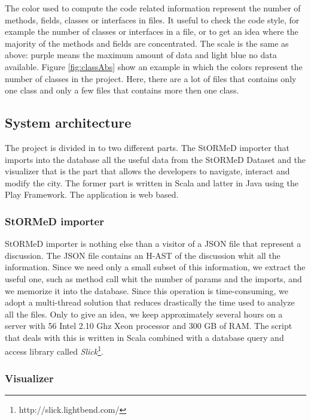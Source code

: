 \documentclass[]{usiinfbachelorproject}
\newcommand {\stormed}[0]{StORMeD\xspace}
\begin{document}
The color used to compute the code related information represent  the number of methods, fields, classes or interfaces in files. It useful to check the code style, for example the number of classes or interfaces in a file, or to get an idea where the majority of the methods and fields are concentrated. The scale is the same as above: purple means the maximum amount of  data and light blue no data available.
Figure \ref{fig:classAbs} show an example in which the colors represent the number of classes in the project. Here, there are a lot of files that contains only one class and only a few files that contains more then one class. 
	




\newpage


\subsection{System architecture }
The project is divided in to two different parts. The \stormed importer that imports into the database all the useful data from the \stormed Dataset and the visualizer that is the part that allows the developers to navigate, interact and modify the city. The former part is written in Scala and latter in Java using the Play Framework. The application is web based. 




\subsubsection{\stormed importer}
\stormed importer is nothing else than a visitor of a JSON file that represent a discussion. The JSON file contains an H-AST of the discussion whit all the information. Since we need only a small subset of this information, we extract the useful one, such as method call whit the number of params and the imports, and we memorize it into the database. Since this operation is time-consuming, we adopt a multi-thread solution that reduces drastically the time used to analyze all the files. Only to give an idea, we keep approximately several hours on a server with 56 Intel 2.10 Ghz Xeon processor and 300 GB of RAM.
The script that deals with this is written in Scala combined with a database query and access library called \textit{Slick}\footnote{http://slick.lightbend.com/}.


\subsubsection{Visualizer}
\end{document}
